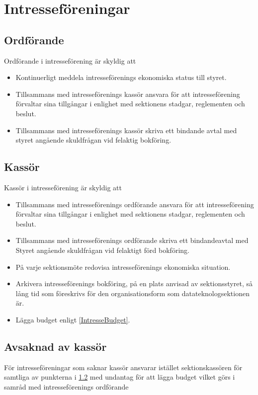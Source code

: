 \documentclass[a4paper]{dtek}
\begin{document}
\section{Intresseföreningar}
\subsection{Ordförande}
Ordförande i intresseförening är skyldig att
\begin{itemize}
  \item Kontinuerligt meddela intresseförenings ekonomiska status till styret.
  \item Tillsammans med intresseförenings kassör ansvara för att intresseförening förvaltar sina tillgångar i enlighet med sektionens stadgar, reglementen och beslut.
  \item Tillsammans med intresseförenings kassör skriva ett bindande avtal med styret angående skuldfrågan vid felaktig bokföring.
\end{itemize}

\subsection{Kassör}\label{IntresseKassör}
Kassör i intresseförening är skyldig att
\begin{itemize}
  \item Tillsammans med intresseförenings ordförande ansvara för att intresseförening förvaltar sina tillgångar i enlighet med sektionens stadgar, reglementen och beslut.
  \item Tillsammans med intresseförenings ordförande skriva ett bindandeavtal med Styret angående skuldfrågan vid felaktigt förd bokföring.
  \item På varje sektionsmöte redovisa intresseförenings ekonomiska situation.
  \item Arkivera intresseförenings bokföring, på en plats anvisad av sektionsstyret, så lång tid som föreskrivs för den organisationsform som datateknologsektionen är.
  \item Lägga budget enligt \ref{IntresseBudget}.
\end{itemize}

\subsection{Avsaknad av kassör}
För intresseföreningar som saknar kassör ansvarar istället sektionskassören för samtliga av punkterna i \ref{IntresseKassör} med undantag för att lägga budget vilket görs i samråd med intresseförenings ordförande
\end{document}
